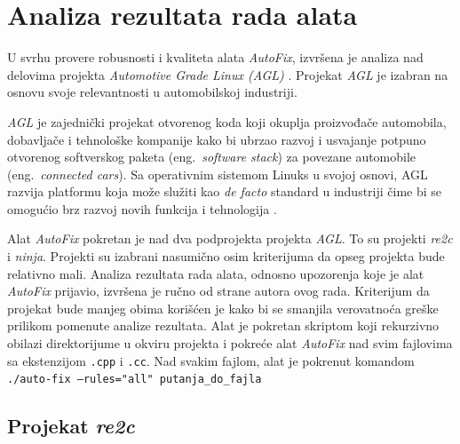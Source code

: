 \documentclass[12pt,oneside]{memoir}
\begin{document}
\section{Analiza rezultata rada alata}

U svrhu provere robusnosti i kvaliteta alata \textit{AutoFix}, izvr\v{s}ena je analiza nad delovima projekta \textit{Automotive Grade Linux (AGL)} \cite{AGL}. Projekat \textit{AGL} je izabran na osnovu svoje relevantnosti u automobilskoj industriji. \par

\textit{AGL} je zajedni\v{c}ki projekat otvorenog koda koji okuplja proizvođa\v{c}e automobila, dobavlja\v{c}e i tehnolo\v{s}ke kompanije kako bi ubrzao razvoj i usvajanje potpuno otvorenog softverskog paketa (eng.~\textit{software stack}) za povezane automobile (eng.~\textit{connected cars}). Sa operativnim sistemom Linuks u svojoj osnovi, AGL razvija platformu koja mo\v{z}e slu\v{z}iti kao \textit{de facto} standard u industriji \v{c}ime bi se omogu\'{c}io brz razvoj novih funkcija i tehnologija \cite{AGL}.
\par
Alat \textit{AutoFix} pokretan je nad dva podprojekta projekta \textit{AGL}. To su projekti \textit{re2c} i \textit{ninja}. Projekti su izabrani nasumi\v{c}no osim kriterijuma
da opseg projekta bude relativno mali. Analiza rezultata rada alata, odnosno upozorenja koje je alat \textit{AutoFix} prijavio, izvr\v{s}ena je ru\v{c}no od strane autora ovog rada. Kriterijum da projekat bude manjeg obima kori\v{s}\'{c}en je kako bi se smanjila verovatno\'{c}a gre\v{s}ke prilikom pomenute analize rezultata. Alat je pokretan skriptom koji rekurzivno 
obilazi direktorijume u okviru projekta i pokre\'{c}e alat \textit{AutoFix} nad  svim fajlovima sa ekstenzijom \texttt{.cpp} i \texttt{.cc}. Nad svakim fajlom, alat je pokrenut komandom \\
\texttt{./auto-fix  --rules="all"  putanja\_do\_fajla }

\subsection{Projekat \textit{re2c}}
\end{document}
